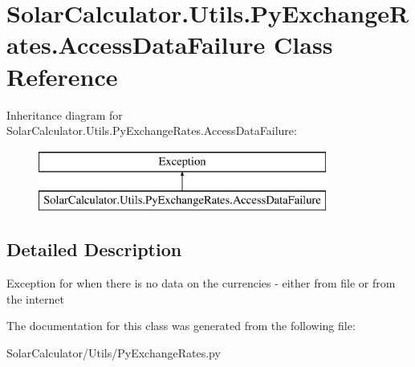 \hypertarget{class_solar_calculator_1_1_utils_1_1_py_exchange_rates_1_1_access_data_failure}{\section{Solar\-Calculator.\-Utils.\-Py\-Exchange\-Rates.\-Access\-Data\-Failure Class Reference}
\label{class_solar_calculator_1_1_utils_1_1_py_exchange_rates_1_1_access_data_failure}
}
Inheritance diagram for Solar\-Calculator.\-Utils.\-Py\-Exchange\-Rates.\-Access\-Data\-Failure\-:\begin{figure}[H]
\begin{center}
\leavevmode
\includegraphics[height=2.000000cm]{class_solar_calculator_1_1_utils_1_1_py_exchange_rates_1_1_access_data_failure}
\end{center}
\end{figure}


\subsection{Detailed Description}
\begin{DoxyVerb}Exception for when there is no data on the currencies - either from file or from the internet   \end{DoxyVerb}
 

The documentation for this class was generated from the following file\-:\begin{DoxyCompactItemize}
\item 
Solar\-Calculator/\-Utils/Py\-Exchange\-Rates.\-py\end{DoxyCompactItemize}
